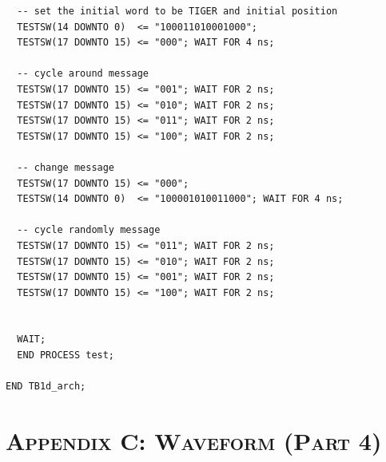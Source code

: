 \documentclass[11pt]{report}
\begin{document}
\begin{spacing}{1.5}
\begin{lstlisting}
  -- set the initial word to be TIGER and initial position
  TESTSW(14 DOWNTO 0)  <= "100011010001000";
  TESTSW(17 DOWNTO 15) <= "000"; WAIT FOR 4 ns;

  -- cycle around message
  TESTSW(17 DOWNTO 15) <= "001"; WAIT FOR 2 ns;
  TESTSW(17 DOWNTO 15) <= "010"; WAIT FOR 2 ns;
  TESTSW(17 DOWNTO 15) <= "011"; WAIT FOR 2 ns;
  TESTSW(17 DOWNTO 15) <= "100"; WAIT FOR 2 ns;

  -- change message
  TESTSW(17 DOWNTO 15) <= "000";
  TESTSW(14 DOWNTO 0)  <= "100001010011000"; WAIT FOR 4 ns;

  -- cycle randomly message
  TESTSW(17 DOWNTO 15) <= "011"; WAIT FOR 2 ns;
  TESTSW(17 DOWNTO 15) <= "010"; WAIT FOR 2 ns;
  TESTSW(17 DOWNTO 15) <= "001"; WAIT FOR 2 ns;
  TESTSW(17 DOWNTO 15) <= "100"; WAIT FOR 2 ns;


  WAIT;                                                        
  END PROCESS test;
                                          
END TB1d_arch;
\end{lstlisting}

\chapter*{\scshape Appendix C: Waveform (Part 4)}
\label{app:c}


\end{spacing}
\end{document}
